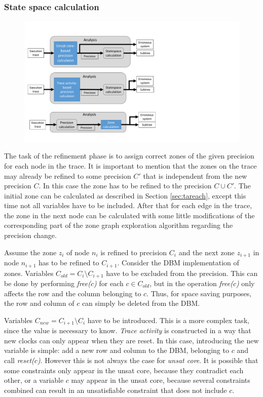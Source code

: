 \begin{runningExample}
\subsubsection{State space calculation}

\begin{figure}[h]
	\centering
	\includegraphics[width=\textwidth]{include/figures/modules_ssp_anal_zone}
\end{figure}


The task of the refinement phase is to assign correct zones of the given precision for each node in the trace. It is important to mention that the zones on the trace may already be refined to some precision $C'$ that is independent from the new precision $C$. In this case the zone has to be refined to the precision $C \cup C'$.  The initial zone can be calculated as described in Section \ref{sec:tareach}, except this time not all variables have to be included.  After that for each edge in the trace, the zone in the next node can be calculated with some little modifications of the corresponding part of the zone graph exploration algorithm regarding the precision change.

Assume the zone $z_i$ of node $n_i$ is refined to precision $C_i$ and the next zone $z_{i+1}$ in node $n_{i+1}$ has to be refined to $C_{i+1}$. Consider the DBM implementation of zones. Variables $C_{old}=C_{i} \setminus C_{i+1}$ have to be excluded from the precision. This can be done by performing \emph{free($c$)} for each $c \in C_{old}$, but in \cite{bengtsson2004timed} the operation \emph{free($c$)} only affects the row and the column belonging to $c$. Thus, for space saving purposes, the row and column of $c$ can simply be deleted from the DBM. 

Variables $C_{new}=C_{i+1} \setminus C_i$ have to be introduced. This is a more complex task, since the value is necessary to know. \emph{Trace activity} is constructed in a way that new clocks can only appear when they are reset. In this case, introducing the new variable is simple: add a new row and column to the DBM, belonging to $c$ and call \emph{reset($c$)}. However this is not always the case for \emph{unsat core}. It is possible that some constraints only appear in the unsat core, because they contradict each other, or a variable $c$ may appear in the unsat core, because several constraints combined can result in an unsatisfiable constraint that does not include $c$. 


\end{runningExample}
